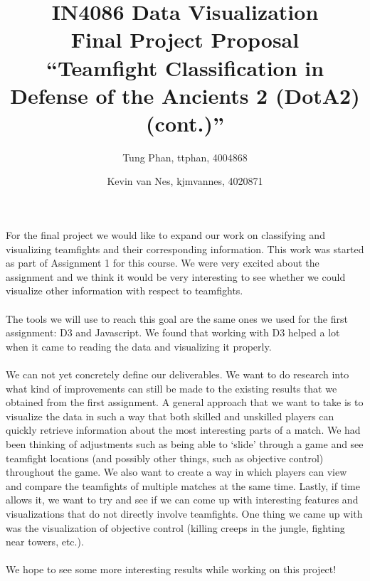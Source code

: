 \documentclass[11pt,twoside,a4paper]{article}
\title{
  IN4086 Data Visualization\\
  Final Project Proposal\\
  ``Teamfight Classification in Defense of the Ancients 2 (DotA2) (cont.)''
}
\author{
    Tung Phan, ttphan, 4004868 \and
    Kevin van Nes, kjmvannes, 4020871
}
\begin{document}
\maketitle

For the final project we would like to expand our work on classifying and visualizing teamfights and their corresponding information. This work was started as part of Assignment 1 for this course. We were very excited about the assignment and we think it would be very interesting to see whether we could visualize other information with respect to teamfights.\\
\\
The tools we will use to reach this goal are the same ones we used for the first assignment: D3 and Javascript. We found that working with D3 helped a lot when it came to reading the data and visualizing it properly.\\
\\
We can not yet concretely define our deliverables. We want to do research into what kind of improvements can still be made to the existing results that we obtained from the first assignment. A general approach that we want to take is to visualize the data in such a way that both skilled and unskilled players can quickly retrieve information about the most interesting parts of a match. We had been thinking of adjustments such as being able to `slide' through a game and see teamfight locations (and possibly other things, such as objective control) throughout the game. We also want to create a way in which players can view and compare the teamfights of multiple matches at the same time. Lastly, if time allows it, we want to try and see if we can come up with interesting features and visualizations that do not directly involve teamfights. One thing we came up with was the visualization of objective control (killing creeps in the jungle, fighting near towers, etc.).\\
\\
We hope to see some more interesting results while working on this project!
\end{document}
